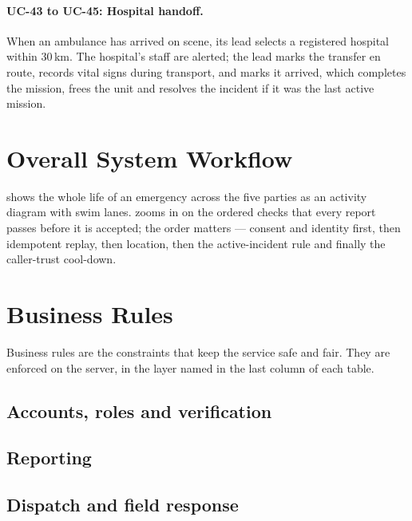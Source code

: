 \paragraph{UC-43 to UC-45: Hospital handoff.} When an ambulance has arrived on scene, its lead selects a registered
hospital within 30\,km. The hospital's staff are alerted; the lead marks the transfer en route, records vital signs
during transport, and marks it arrived, which completes the mission, frees the unit and resolves the incident if
it was the last active mission.

\section{Overall System Workflow}

 shows the whole life of an emergency across the five parties as an activity diagram with
swim lanes.  zooms in on the ordered checks that every report passes before it is accepted;
the order matters --- consent and identity first, then idempotent replay, then location, then the active-incident
rule and finally the caller-trust cool-down.


\section{Business Rules}\label{sec:business-rules}

Business rules are the constraints that keep the service safe and fair. They are enforced on the server, in the
layer named in the last column of each table.

\subsection{Accounts, roles and verification}
\subsection{Reporting}
\subsection{Dispatch and field response}

